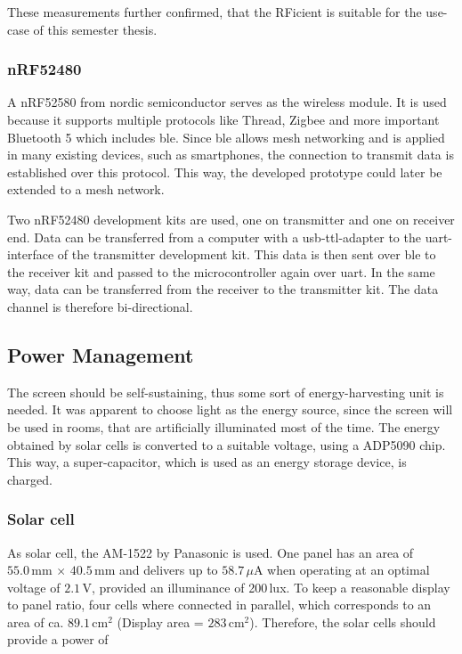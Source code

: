 These measurements further confirmed, that the RFicient is suitable for the use-case of this semester thesis.

\subsubsection{nRF52480}
A nRF52580 from nordic semiconductor serves as the wireless module.
It is used because it supports multiple protocols like Thread, Zigbee and more important Bluetooth 5 which includes \acf{ble}\cite{nrfpb}.
Since \acs{ble} allows mesh networking and is applied in many existing devices, such as smartphones, the connection to transmit data is established over this protocol.
This way, the developed prototype could later be extended to a mesh network.

Two nRF52480 development kits are used, one on transmitter and one on receiver end.
Data can be transferred from a computer with a \acs{usb}-\acs{ttl}-adapter to the \acs{uart}-interface of the transmitter development kit.
This data is then sent over \acs{ble} to the receiver kit and passed to the microcontroller again over \acs{uart}.
In the same way, data can be transferred from the receiver to the transmitter kit.
The data channel is therefore bi-directional. 

\subsection{Power Management}
The screen should be self-sustaining, thus some sort of energy-harvesting unit is needed.
It was apparent to choose light as the energy source, since the screen will be used in rooms, that are artificially illuminated most of the time.
The energy  obtained by solar cells is converted to a suitable voltage, using a ADP5090 chip.
This way, a super-capacitor, which is used as an energy storage device, is charged.

\subsubsection{Solar cell}
As solar cell, the AM-1522 by Panasonic is used.
One panel has an area of $55.0\,\text{mm}\,\times\,40.5\,\text{mm}$ and delivers up to $58.7\, \mu\text{A}$ when operating at an optimal voltage of $2.1\,\text{V}$, provided an illuminance of 200\,lux.
To keep a reasonable display to panel ratio, four cells where connected in parallel, which corresponds to an area of ca. $89.1\,\text{cm}^2$ (Display area = $283\,\text{cm}^2$). Therefore, the solar cells should provide a power of

